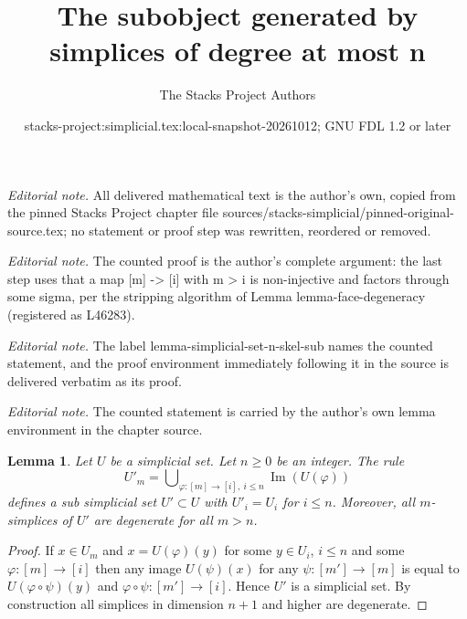 \documentclass{stacks-project}
\title{The subobject generated by simplices of degree at most n}
\author{The Stacks Project Authors}
\date{stacks-project:simplicial.tex:local-snapshot-20261012; GNU FDL 1.2 or later}
\theoremstyle{plain}
\newtheorem{lemma}[subsection]{Lemma}
\theoremstyle{definition}
\theoremstyle{remark}
\numberwithin{equation}{subsection}
\def\Im{\mathop{\mathrm{Im}}}
\begin{document}
\maketitle
\noindent\textit{Editorial note.} All delivered mathematical text is the author's own, copied from the pinned Stacks Project chapter file sources/stacks-simplicial/pinned-original-source.tex; no statement or proof step was rewritten, reordered or removed.\par\medskip
\noindent\textit{Editorial note.} The counted proof is the author's complete argument: the last step uses that a map [m] -> [i] with m > i is non-injective and factors through some sigma, per the stripping algorithm of Lemma lemma-face-degeneracy (registered as L46283).\par\medskip
\noindent\textit{Editorial note.} The label lemma-simplicial-set-n-skel-sub names the counted statement, and the proof environment immediately following it in the source is delivered verbatim as its proof.\par\medskip
\noindent\textit{Editorial note.} The counted statement is carried by the author's own lemma environment in the chapter source.\par\medskip
\begin{lemma}
\label{lemma-simplicial-set-n-skel-sub}
Let $U$ be a simplicial set.
Let $n \geq 0$ be an integer.
The rule
$$
U'_m = \bigcup\nolimits_{\varphi : [m] \to [i], \ i\leq n} \Im(U(\varphi))
$$
defines a sub simplicial set $U' \subset U$ with
$U'_i = U_i$ for $i \leq n$.
Moreover, all $m$-simplices of $U'$ are degenerate for
all $m > n$.
\end{lemma}

\begin{proof}
If $x \in U_m$ and $x = U(\varphi)(y)$
for some $y \in U_i$, $i \leq n$ and some $\varphi : [m] \to [i]$
then any image $U(\psi)(x)$ for any $\psi : [m'] \to [m]$ is
equal to $U(\varphi \circ \psi)(y)$ and $\varphi \circ \psi :
[m'] \to [i]$. Hence $U'$ is a simplicial set. By construction
all simplices in dimension $n + 1$ and higher are degenerate.
\end{proof}
\end{document}
